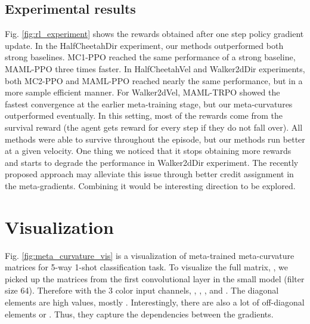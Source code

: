 \documentclass{article}
\begin{document}
\subsection{Experimental results}
Fig. \ref{fig:rl_experiment} shows the rewards obtained after one step policy gradient update. In the HalfCheetahDir experiment, our methods outperformed both strong baselines. MC1-PPO reached the same performance of a strong baseline, MAML-PPO three times faster. In HalfCheetahVel and Walker2dDir experiments, both MC2-PPO and MAML-PPO reached nearly the same performance, but in a more sample efficient manner. For Walker2dVel, MAML-TRPO showed the fastest convergence at the earlier meta-training stage, but our meta-curvatures outperformed eventually. In this setting, most of the rewards come from the survival reward (the agent gets  reward for every step if they do not fall over). All methods were able to survive throughout the episode, but our methods run better at a given velocity. One thing we noticed that it stops obtaining more rewards and starts to degrade the performance in Walker2dDir experiment. The recently proposed approach \cite{promp} may alleviate this issue through better credit assignment in the meta-gradients. Combining it would be interesting direction to be explored.

\section{Visualization}
Fig. \ref{fig:meta_curvature_vis} is a visualization of meta-trained meta-curvature matrices for 5-way 1-shot classification task. To visualize the full matrix, , we picked up the matrices from the first convolutional layer in the small model (filter size 64). Therefore with the 3 color input channels, , , , and . The diagonal elements are high values, mostly . Interestingly, there are also a lot of off-diagonal elements  or . Thus, they capture the dependencies between the gradients.
\end{document}
